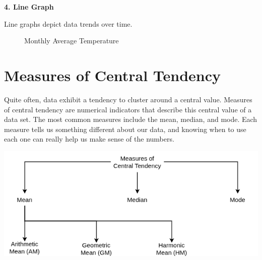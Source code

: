 \documentclass[twoside]{book}
\begin{document}
\textbf{4. Line Graph}

Line graphs depict data trends over time.

\begin{figure}[H]
\centering
{}
\caption{Monthly Average Temperature}
\end{figure}

\section{Measures of Central Tendency}

Quite often, data exhibit a tendency to cluster around a central value. Measures of central tendency are numerical indicators that describe this central value of a data set. The most common measures include the mean, median, and mode. Each measure tells us something different about our data, and knowing when to use each one can really help us make sense of the numbers.




\begin{center}
    \includegraphics[scale=0.5]{pic/moct.drawio.png}
\end{center}
\end{document}
